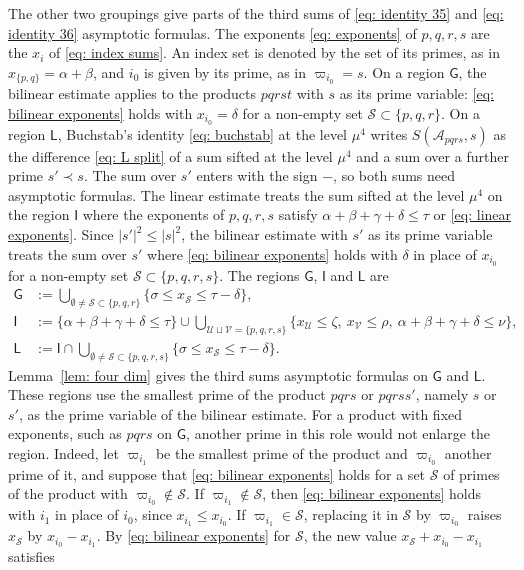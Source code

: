 \documentclass{article}
\numberwithin{equation}{section}
\newcommand{\Le}{\leqslant}
\begin{document}
The other two groupings give parts of the third sums of \eqref{eq: identity 35} and \eqref{eq: identity 36} asymptotic formulas. The exponents \eqref{eq: exponents} of $p, q, r, s$ are the $x_i$ of \eqref{eq: index sums}. An index set is denoted by the set of its primes, as in $x_{\{p, q\}} = \alpha + \beta$, and $i_0$ is given by its prime, as in $\varpi_{i_0} = s$. On a region $\mathsf{G}$, the bilinear estimate applies to the products $pqrst$ with $s$ as its prime variable: \eqref{eq: bilinear exponents} holds with $x_{i_0} = \delta$ for a non-empty set $\mathcal{S} \subset \{p, q, r\}$. On a region $\mathsf{L}$, Buchstab's identity \eqref{eq: buchstab} at the level $\mu^4$ writes $S(\mathcal{A}_{pqrs}, s)$ as the difference \eqref{eq: L split} of a sum sifted at the level $\mu^4$ and a sum over a further prime $s' \prec s$. The sum over $s'$ enters with the sign $-$, so both sums need asymptotic formulas. The linear estimate treats the sum sifted at the level $\mu^4$ on the region $\mathsf{I}$ where the exponents of $p, q, r, s$ satisfy $\alpha + \beta + \gamma + \delta \Le \tau$ or \eqref{eq: linear exponents}. Since $|s'|^2 \Le |s|^2$, the bilinear estimate with $s'$ as its prime variable treats the sum over $s'$ where \eqref{eq: bilinear exponents} holds with $\delta$ in place of $x_{i_0}$ for a non-empty set $\mathcal{S} \subset \{p, q, r, s\}$. The regions $\mathsf{G}$, $\mathsf{I}$ and $\mathsf{L}$ are
\begin{equation}
\label{eq: regions G L}
\begin{aligned}
\mathsf{G} &:= \bigcup_{\emptyset \neq \mathcal{S} \subset \{p, q, r\}} \bigl\{ \sigma \Le x_{\mathcal{S}} \Le \tau - \delta \bigr\}, \\
\mathsf{I} &:= \bigl\{ \alpha + \beta + \gamma + \delta \Le \tau \bigr\} \cup \bigcup_{\mathcal{U} \sqcup \mathcal{V} = \{p, q, r, s\}} \bigl\{ x_{\mathcal{U}} \Le \zeta,\ x_{\mathcal{V}} \Le \rho,\ \alpha + \beta + \gamma + \delta \Le \nu \bigr\}, \\
\mathsf{L} &:= \mathsf{I} \cap \bigcup_{\emptyset \neq \mathcal{S} \subset \{p, q, r, s\}} \bigl\{ \sigma \Le x_{\mathcal{S}} \Le \tau - \delta \bigr\}.
\end{aligned}
\end{equation}
Lemma~\ref{lem: four dim} gives the third sums asymptotic formulas on $\mathsf{G}$ and $\mathsf{L}$. These regions use the smallest prime of the product $pqrs$ or $pqrss'$, namely $s$ or $s'$, as the prime variable of the bilinear estimate. For a product with fixed exponents, such as $pqrs$ on $\mathsf{G}$, another prime in this role would not enlarge the region. Indeed, let $\varpi_{i_1}$ be the smallest prime of the product and $\varpi_{i_0}$ another prime of it, and suppose that \eqref{eq: bilinear exponents} holds for a set $\mathcal{S}$ of primes of the product with $\varpi_{i_0} \notin \mathcal{S}$. If $\varpi_{i_1} \notin \mathcal{S}$, then \eqref{eq: bilinear exponents} holds with $i_1$ in place of $i_0$, since $x_{i_1} \Le x_{i_0}$. If $\varpi_{i_1} \in \mathcal{S}$, replacing it in $\mathcal{S}$ by $\varpi_{i_0}$ raises $x_{\mathcal{S}}$ by $x_{i_0} - x_{i_1}$. By \eqref{eq: bilinear exponents} for $\mathcal{S}$, the new value $x_{\mathcal{S}} + x_{i_0} - x_{i_1}$ satisfies
\end{document}

